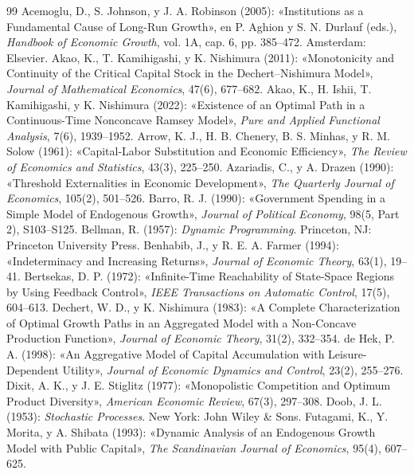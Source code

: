\documentclass[11pt,letterpaper]{article}
\theoremstyle{plain}
\begin{document}
\begin{thebibliography}{99}
 Acemoglu, D., S. Johnson, y J. A. Robinson (2005): «Institutions as a Fundamental Cause of Long-Run Growth», en P. Aghion y S. N. Durlauf (eds.), \emph{Handbook of Economic Growth}, vol. 1A, cap. 6, pp. 385--472. Amsterdam: Elsevier.
 Akao, K., T. Kamihigashi, y K. Nishimura (2011): «Monotonicity and Continuity of the Critical Capital Stock in the Dechert--Nishimura Model», \emph{Journal of Mathematical Economics}, 47(6), 677--682.
 Akao, K., H. Ishii, T. Kamihigashi, y K. Nishimura (2022): «Existence of an Optimal Path in a Continuous-Time Nonconcave Ramsey Model», \emph{Pure and Applied Functional Analysis}, 7(6), 1939--1952.
 Arrow, K. J., H. B. Chenery, B. S. Minhas, y R. M. Solow (1961): «Capital-Labor Substitution and Economic Efficiency», \emph{The Review of Economics and Statistics}, 43(3), 225--250.
 Azariadis, C., y A. Drazen (1990): «Threshold Externalities in Economic Development», \emph{The Quarterly Journal of Economics}, 105(2), 501--526.
 Barro, R. J. (1990): «Government Spending in a Simple Model of Endogenous Growth», \emph{Journal of Political Economy}, 98(5, Part 2), S103--S125.
 Bellman, R. (1957): \emph{Dynamic Programming}. Princeton, NJ: Princeton University Press.
 Benhabib, J., y R. E. A. Farmer (1994): «Indeterminacy and Increasing Returns», \emph{Journal of Economic Theory}, 63(1), 19--41.
 Bertsekas, D. P. (1972): «Infinite-Time Reachability of State-Space Regions by Using Feedback Control», \emph{IEEE Transactions on Automatic Control}, 17(5), 604--613.
 Dechert, W. D., y K. Nishimura (1983): «A Complete Characterization of Optimal Growth Paths in an Aggregated Model with a Non-Concave Production Function», \emph{Journal of Economic Theory}, 31(2), 332--354.
 de Hek, P. A. (1998): «An Aggregative Model of Capital Accumulation with Leisure-Dependent Utility», \emph{Journal of Economic Dynamics and Control}, 23(2), 255--276.
 Dixit, A. K., y J. E. Stiglitz (1977): «Monopolistic Competition and Optimum Product Diversity», \emph{American Economic Review}, 67(3), 297--308.
 Doob, J. L. (1953): \emph{Stochastic Processes}. New York: John Wiley \& Sons.
 Futagami, K., Y. Morita, y A. Shibata (1993): «Dynamic Analysis of an Endogenous Growth Model with Public Capital», \emph{The Scandinavian Journal of Economics}, 95(4), 607--625.

\end{thebibliography}
\end{document}
